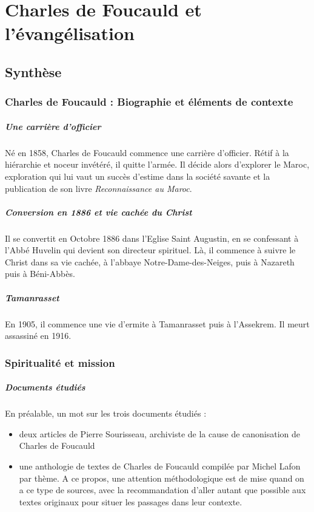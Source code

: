 \chapter{Charles de Foucauld et l'évangélisation}

\section{Synthèse}

\subsection{Charles de Foucauld : Biographie et éléments de contexte}

\paragraph{Une carrière d'officier} Né en 1858, Charles de Foucauld commence une carrière d'officier. Rétif à la hiérarchie et noceur invétéré, il quitte l'armée. Il décide alors d'explorer le Maroc, exploration qui lui vaut un succès d'estime dans la société savante et la publication de son livre \textit{Reconnaissance au Maroc}.

\paragraph{Conversion en 1886 et vie cachée du Christ} Il se convertit en Octobre 1886 dans l'Eglise Saint Augustin, en se confessant à l'Abbé Huvelin qui devient son directeur spirituel. Là, il commence à suivre le Christ dans sa vie cachée, à l'abbaye Notre-Dame-des-Neiges, puis à Nazareth puis à Béni-Abbès.

\paragraph{Tamanrasset} En 1905, il commence une vie d'ermite à Tamanrasset puis à l'Assekrem. Il meurt assassiné en 1916.

\subsection{Spiritualité et mission}

\paragraph{Documents étudiés} En préalable, un mot sur les trois documents étudiés : 
\begin{itemize}
    \item deux articles de Pierre Sourisseau, archiviste de la cause de canonisation de Charles de Foucauld
    \item une anthologie de textes de Charles de Foucauld compilée par Michel Lafon par thème. A ce propos, une attention méthodologique est de mise quand on a ce type de sources, avec la recommandation d'aller autant que possible aux textes originaux  pour situer les passages dans leur contexte.
\end{itemize}



